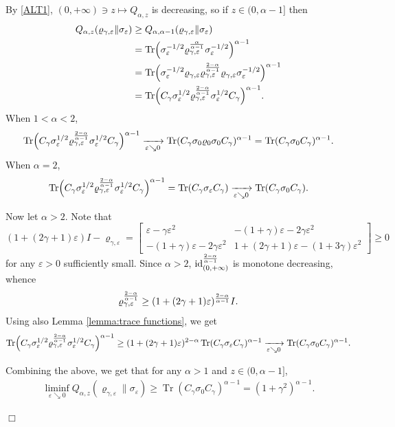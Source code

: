 \documentclass[unsortedaddress,superscriptaddress,pra,notitlepage]{revtex4}
\newenvironment{proof}[1][Proof]{\begin{trivlist}
\item[\hskip \labelsep {\bfseries #1}]}{\hfill$\Box$\end{trivlist}}
\def\ep{\varepsilon}
\def\rho{\varrho}
\def\eps{\varepsilon}
\DeclareMathOperator{\id}{id}
\DeclareMathOperator{\Tr}{Tr}
\begin{document}
\begin{proof}
By \eqref{ALT1}, $(0,+\infty)\ni z\mapsto Q_{\alpha,z}$ is decreasing, 
so if $z\in(0,\alpha-1]$ then 
\begin{align*}
Q_{\alpha,z}(\rho_{\gamma,\eps}\|\sigma_\eps)
&\ge Q_{\alpha,\alpha-1}(\rho_{\gamma,\eps}\|\sigma_\eps) \\
&=\Tr\Bigl(\sigma_\eps^{-1/2}\rho_{\gamma,\eps}^{\alpha\over\alpha-1}
\sigma_\eps^{-1/2}\Bigr)^{\alpha-1} \\
&=\Tr\Bigl(\sigma_\eps^{-1/2}\rho_{\gamma,\eps}\rho_{\gamma,\eps}^{2-\alpha\over\alpha-1}
\rho_{\gamma,\eps}\sigma_\eps^{-1/2}\Bigr)^{\alpha-1} \\
&=\Tr\Bigl(C_{\gamma}\sigma_\eps^{1/2}\rho_{\gamma,\eps}^{2-\alpha\over\alpha-1}
\sigma_\eps^{1/2}C_{\gamma}\Bigr)^{\alpha-1}.
\end{align*}
When $1<\alpha<2$, 
\[
\Tr\Bigl(C_{\gamma}\sigma_\eps^{1/2}\rho_{\gamma,\eps}^{2-\alpha\over\alpha-1}
\sigma_\eps^{1/2}C_{\gamma}\Bigr)^{\alpha-1}
\xrightarrow[\eps\searrow0]{}\Tr(C_{\gamma}\sigma_0\rho_0\sigma_0C_{\gamma})^{\alpha-1}
=
\Tr(C_{\gamma}\sigma_0C_{\gamma})^{\alpha-1}.
\]
When $\alpha=2$,
\[
\Tr\Bigl(C_{\gamma}\sigma_\eps^{1/2}\rho_{\gamma,\eps}^{2-\alpha\over\alpha-1}
\sigma_\eps^{1/2}C_{\gamma}\Bigr)^{\alpha-1}=\Tr(C_{\gamma}\sigma_\eps C_{\gamma})
\xrightarrow[\eps\searrow0]{}\Tr(C_{\gamma}\sigma_0C_{\gamma}).
\]

Now let $\alpha>2$. Note that 
\[
(1+(2\gamma+1)\eps)I-\rho_{\gamma,\eps}
=\begin{bmatrix}\eps-\gamma\eps^2 & -(1+\gamma)\ep-2\gamma\ep^2\\
 -(1+\gamma)\ep-2\gamma\ep^2 &
 1+(2\gamma+1)\eps-(1+3\gamma)\ep^2\end{bmatrix}\ge0
\]
for any $\eps>0$ sufficiently small. 
Since $\alpha>2$, $\id_{(0,+\infty)}^{2-\alpha\over\alpha-1}$ is 
monotone decreasing, whence
\[
\rho_{\gamma,\eps}^{2-\alpha\over\alpha-1}\ge(1+(2\gamma+1)\eps)^{2-\alpha\over\alpha-1}I.
\]
Using also Lemma \ref{lemma:trace functions}, we get 
\[
\Tr\Bigl(C_{\gamma}\sigma_\eps^{1/2}\rho_{\gamma,\eps}^{2-\alpha\over\alpha-1}
\sigma_\eps^{1/2}C_{\gamma}\Bigr)^{\alpha-1}
\ge
(1+(2\gamma+1)\eps)^{2-\alpha}\Tr(C_{\gamma}\sigma_\eps C_{\gamma})^{\alpha-1}
\xrightarrow[\ep\searrow 0]{}
\Tr(C_{\gamma}\sigma_0C_{\gamma})^{\alpha-1}.
\]

Combining the above, we get that 
for any $\alpha>1$ and $z\in(0,\alpha-1]$,
\begin{align}\label{liminf pos}
\liminf_{\eps\searrow0}Q_{\alpha,z}(\rho_{\gamma,\eps}\|\sigma_\eps)
\ge\Tr(C_{\gamma}\sigma_0C_{\gamma})^{\alpha-1}
=(1+\gamma^2)^{\alpha-1}.
\end{align}


\end{proof}
\end{document}
